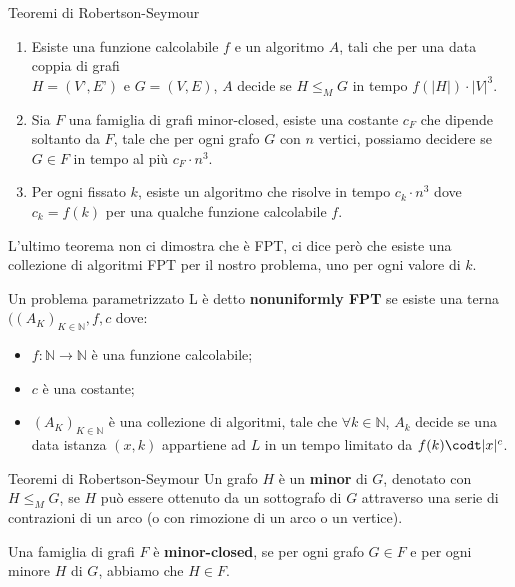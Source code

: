 \documentclass[10pt,a4paper]{article}
\begin{document}
\begin{multicols}{3}
\begin{textbox}{Teoremi di Robertson-Seymour}
\begin{enumerate}[leftmargin=*]
    Per ogni fissata famiglia minor-closed \(F\), esiste un insieme finito di grafi \(Forb(F)\), detta famiglia dei \textbf{minimal forbidden minors}, tale che qualsiasi grafo \(G\) appartiene a \(F\) se e solo se non esiste un minor di \(G\) che corrisponde (a meno di un isomorfismo) a un membro di \(Forb(F)\).
    \item Esiste una funzione calcolabile \(f\) e un algoritmo \(A\), tali che per una data coppia di grafi\\\(H=(V’,E’)\) e \(G=(V,E)\), \(A\) decide se \(H \leq_M G\) in tempo \(f(|H|)\cdot |V|^3\).
    \item Sia \(F\) una famiglia di grafi minor-closed, esiste una costante \(c_F\) che dipende soltanto da \(F\), tale che per ogni grafo \(G\) con \(n\) vertici, possiamo decidere se \(G\in F\) in tempo al più \(c_F\cdot n^3\).
    \item Per ogni fissato \(k\), esiste un algoritmo che risolve  in tempo \(c_k\cdot n^3\) dove \(c_k=f(k)\) per una qualche funzione calcolabile \(f\).
\end{enumerate}
L'ultimo teorema non ci dimostra che  è FPT, 
ci dice però che esiste una collezione di algoritmi FPT per
il nostro problema, uno per ogni valore di \(k\).

Un problema parametrizzato L è detto \textbf{nonuniformly FPT}
se esiste una terna \(((A_K)_{K\in \mathbb{N}},f,c\) dove:
\begin{itemize}[leftmargin=*]
    \item \(f:\mathbb{N} \rightarrow \mathbb{N}\) è una funzione calcolabile;
    \item \(c\) è una costante;
    \item \((A_K)_{K\in \mathbb{N}}\) è una collezione di algoritmi, tale che
    \(\forall k \in \mathbb{N}\), \(A_k\) decide se una data istanza \((x,k)\)
    appartiene ad \(L\) in un tempo limitato da \(f(k)\codt |x|^c\).
\end{itemize}
\end{textbox}
\begin{textbox}{Teoremi di Robertson-Seymour}
Un grafo \(H\) è un \textbf{minor} di \(G\), denotato con \(H \leq_M G\), se \(H\)
può essere ottenuto da un sottografo di \(G\) attraverso una serie di
contrazioni di un arco (o con rimozione di un arco o un vertice).

Una famiglia di grafi \(F\) è \textbf{minor-closed}, se per ogni grafo \(G \in F\) e
per ogni minore \(H\) di \(G\), abbiamo che \(H \in F\).


\end{textbox}
\end{multicols}
\end{document}
